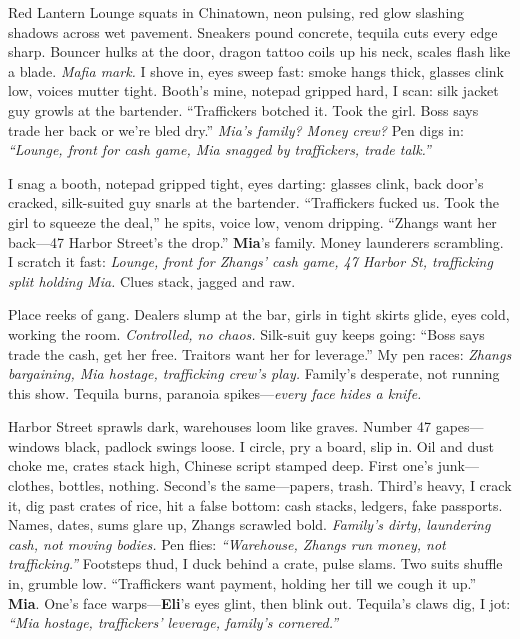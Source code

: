 \documentclass{article}
\begin{document}
Red Lantern Lounge squats in Chinatown, neon pulsing, red glow slashing shadows across wet pavement. Sneakers pound concrete, tequila cuts every edge sharp. Bouncer hulks at the door, dragon tattoo coils up his neck, scales flash like a blade. \textit{Mafia mark.} I shove in, eyes sweep fast: smoke hangs thick, glasses clink low, voices mutter tight. Booth’s mine, notepad gripped hard, I scan: silk jacket guy growls at the bartender. “Traffickers botched it. Took the girl. Boss says trade her back or we’re bled dry.” \textit{Mia’s family? Money crew?} Pen digs in: \textit{“Lounge, front for cash game, Mia snagged by traffickers, trade talk.”}

I snag a booth, notepad gripped tight, eyes darting: glasses clink, back door’s cracked, silk-suited guy snarls at the bartender. “Traffickers fucked us. Took the girl to squeeze the deal,” he spits, voice low, venom dripping. “Zhangs want her back—47 Harbor Street’s the drop.” \textbf{Mia}’s family. Money launderers scrambling. I scratch it fast: \textit{Lounge, front for Zhangs’ cash game, 47 Harbor St, trafficking split holding Mia.} Clues stack, jagged and raw.

Place reeks of gang. Dealers slump at the bar, girls in tight skirts glide, eyes cold, working the room. \textit{Controlled, no chaos.} Silk-suit guy keeps going: “Boss says trade the cash, get her free. Traitors want her for leverage.” My pen races: \textit{Zhangs bargaining, Mia hostage, trafficking crew’s play.} Family’s desperate, not running this show. Tequila burns, paranoia spikes—\textit{every face hides a knife.}

Harbor Street sprawls dark, warehouses loom like graves. Number 47 gapes—windows black, padlock swings loose. I circle, pry a board, slip in. Oil and dust choke me, crates stack high, Chinese script stamped deep. First one’s junk—clothes, bottles, nothing. Second’s the same—papers, trash. Third’s heavy, I crack it, dig past crates of rice, hit a false bottom: cash stacks, ledgers, fake passports. Names, dates, sums glare up, Zhangs scrawled bold. \textit{Family’s dirty, laundering cash, not moving bodies.} Pen flies: \textit{“Warehouse, Zhangs run money, not trafficking.”} Footsteps thud, I duck behind a crate, pulse slams. Two suits shuffle in, grumble low. “Traffickers want payment, holding her till we cough it up.” \textbf{Mia}. One’s face warps—\textbf{Eli}’s eyes glint, then blink out. Tequila’s claws dig, I jot: \textit{“Mia hostage, traffickers’ leverage, family’s cornered.”}
\end{document}
